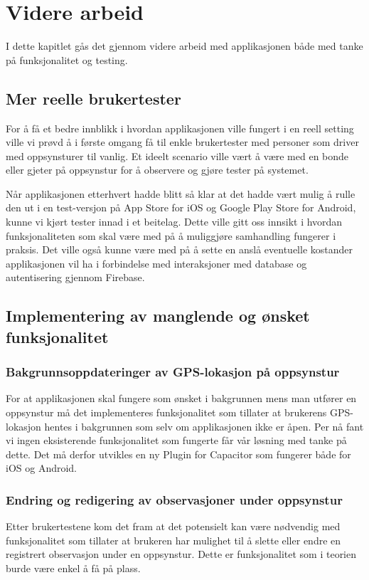 \chapter{Videre arbeid}
I dette kapitlet gås det gjennom videre arbeid med applikasjonen både med tanke på funksjonalitet og testing.

\section{Mer reelle brukertester}
For å få et bedre innblikk i hvordan applikasjonen ville fungert i en reell setting ville vi prøvd å i første omgang få til enkle brukertester med personer som driver med oppsynsturer til vanlig. Et ideelt scenario ville vært å være med en bonde eller gjeter på oppsynstur for å observere og gjøre tester på systemet.
\newline

\noindent
Når applikasjonen etterhvert hadde blitt så klar at det hadde vært mulig å rulle den ut i en test-versjon på App Store for iOS og Google Play Store for Android, kunne vi kjørt tester innad i et beitelag. Dette ville gitt oss innsikt i hvordan funksjonaliteten som skal være med på å muliggjøre samhandling fungerer i praksis. Det ville også kunne være med på å sette en anslå eventuelle kostander applikasjonen vil ha i forbindelse med interaksjoner med database og autentisering gjennom Firebase.

\section{Implementering av manglende og ønsket funksjonalitet}
\subsection{Bakgrunnsoppdateringer av GPS-lokasjon på oppsynstur}
For at applikasjonen skal fungere som ønsket i bakgrunnen mens man utfører en oppsynstur må det implementeres funksjonalitet som tillater at brukerens GPS-lokasjon hentes i bakgrunnen som selv om applikasjonen ikke er åpen. Per nå fant vi ingen eksisterende funksjonalitet som fungerte får vår løsning med tanke på dette. Det må derfor utvikles en ny Plugin for Capacitor som fungerer både for iOS og Android.

\subsection{Endring og redigering av observasjoner under oppsynstur}
Etter brukertestene kom det fram at det potensielt kan være nødvendig med funksjonalitet som tillater at brukeren har mulighet til å slette eller endre en registrert observasjon under en oppsynstur. Dette er funksjonalitet som i teorien burde være enkel å få på plass.

